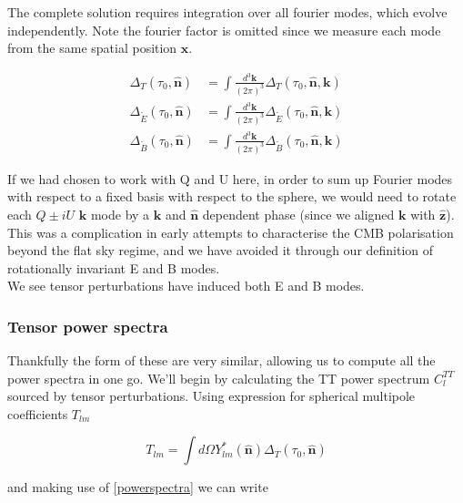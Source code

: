 \documentclass[a4paper,10pt]{article}
\renewcommand{\v}[1]{\mathbf{#1}}
\newcommand{\fint}[1]{\int \frac{d^3 \v{#1}}{(2\pi)^3}}
\newcommand{\unit}[1]{\hat{\v{#1}}}
\begin{document}
The complete solution requires integration over all fourier modes, which evolve independently. Note the fourier factor is omitted since we measure each mode from the same spatial position $\v{x}$.

\begin{equation}\begin{split}
\Delta_T(\tau_0,\unit{n}) &= \fint{k} \Delta_T(\tau_0,\unit{n},\v{k})\\
\Delta_{\tilde{E}}(\tau_0,\unit{n}) &= \fint{k}\Delta_{\tilde{E}}(\tau_0,\unit{n},\v{k})\\
\Delta_{\tilde{B}}(\tau_0,\unit{n}) &= \fint{k}\Delta_{\tilde{B}}(\tau_0,\unit{n},\v{k})
\end{split}\end{equation}

If we had chosen to work with Q and U here, in order to sum up Fourier modes with respect to a fixed basis with respect to the sphere, we would need to rotate each $Q\pm iU$ $\v{k}$ mode by a $\v{k}$ and $\unit{n}$ dependent phase (since we aligned $\v{k}$ with $\unit{z}$). This was a complication in early attempts to characterise the CMB polarisation beyond the flat sky regime, and we have avoided it through our definition of rotationally invariant E and B modes.\\

We see tensor perturbations have induced both E and B modes.

\subsubsection{Tensor power spectra}

Thankfully the form of these are very similar, allowing us to compute all the power spectra in one go. We'll begin by calculating the TT power spectrum $C_l^{TT}$ sourced by tensor perturbations. Using expression for spherical multipole coefficients $T_{lm}$  

\begin{equation}
T_{lm} = \int d\Omega Y_{lm}^*(\unit{n})\Delta_T(\tau_0,\unit{n})
\end{equation}

and making use of \ref{powerspectra} we can write 
\end{document}
